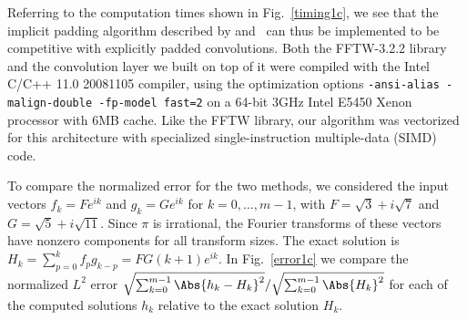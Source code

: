 \documentclass[final]{siamltex}
\begin{document}
Referring to the computation times shown in Fig.~\ref{timing1c},
we see that the implicit padding algorithm described by  
and~
can thus be implemented to be competitive with explicitly padded
convolutions. Both the FFTW-3.2.2 library and the convolution layer we built on
top of it were compiled with the Intel C/C++ 11.0 20081105 compiler, using
the optimization options {\tt -ansi-alias -malign-double -fp-model fast=2}
on a 64-bit 3GHz Intel E5450 Xenon processor with 6MB cache. Like the FFTW
library, our algorithm was vectorized for this architecture with
specialized single-instruction multiple-data (SIMD) code.

To compare the normalized error for the two methods, we considered the
input vectors $f_k=F e^{ik}$ and $g_k=G e^{ik}$ for $k=0,\ldots,m-1$,
with $F=\sqrt3+ i\sqrt 7$ and $G=\sqrt5+ i\sqrt {11}$.
Since $\pi$ is irrational, the Fourier transforms of these vectors have
nonzero components for all transform sizes.
The exact solution is $H_k=\sum_{p=0}^k f_p g_{k-p}=FG (k+1) e^{ik}$.
In Fig.~\ref{error1c} we compare the normalized $L^2$ error 
$\sqrt{\sum_{k=0}^{m-1}\Abs{h_k-H_k}^2}/\sqrt{\sum_{k=0}^{m-1} \Abs{H_k}^2}$
for each of the computed solutions $h_k$ relative to the exact solution $H_k$.

\setlength{\algomargin}{0.6em}
\SetAlCapSkip{3pt}
\def\fft{{\tt fft}}
\def\crfft{{\tt crfft}}
\def\rcfft{{\tt rcfft}}
\def\fftOpadBackwards{{\tt fft0padBackwards}}
\def\fftOpadForwards{{\tt fft0padForwards}}
\def\fftObipadBackwards{{\tt fft0bipadBackwards}}
\def\fftObipadForwards{{\tt fft0bipadForwards}}
\end{document}

